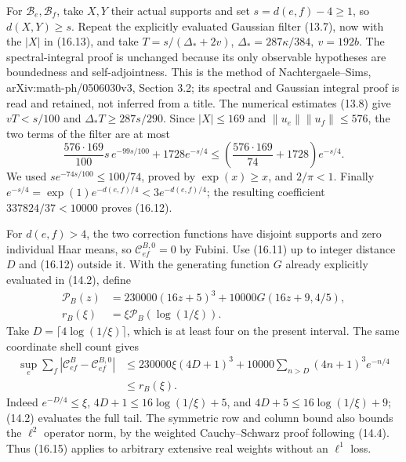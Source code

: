 \documentclass[
]{article}
\begin{document}
For \(\mathcal B_e,\mathcal B_f\), take \(X,Y\) their actual supports
and set \(s=d(e,f)-4\ge1\), so \(d(X,Y)\ge s\). Repeat the explicitly
evaluated Gaussian filter (13.7), now with the \(|X|\) in (16.13), and
take \(T=s/(\Delta_*+2v)\), \(\Delta_*=287\kappa/384,\ v=192b\). The
spectral-integral proof is unchanged because its only observable
hypotheses are boundedness and self-adjointness. This is the method of
Nachtergaele--Sims, arXiv:math-ph/0506030v3, Section 3.2; its spectral
and Gaussian integral proof is read and retained, not inferred from a
title. The numerical estimates (13.8) give \(vT<s/100\) and
\(\Delta_*T\ge287s/290\). Since \(|X|\le169\) and
\(\|u_e\|\|u_f\|\le576\), the two terms of the filter are at most \[
\frac{576\cdot169}{100}s\,e^{-99s/100}
       +1728e^{-s/4}
 \le\left(\frac{576\cdot169}{74}+1728\right)e^{-s/4}.
\] We used \(s e^{-74s/100}\le100/74\), proved by \(\exp(x)\ge x\), and
\(2/\pi<1\). Finally \(e^{-s/4}=\exp(1)e^{-d(e,f)/4}<3e^{-d(e,f)/4}\);
the resulting coefficient \(337824/37<10000\) proves (16.12).

For \(d(e,f)>4\), the two correction functions have disjoint supports
and zero individual Haar means, so \(\mathcal C^{B,0}_{ef}=0\) by
Fubini. Use (16.11) up to integer distance \(D\) and (16.12) outside it.
With the generating function \(G\) already explicitly evaluated in
(14.2), define \[
\begin{split}
\mathcal P_B(z)&=230000(16z+5)^3+10000G(16z+9,4/5),\\
r_B(\xi)&=\xi\mathcal P_B(\log(1/\xi)).
\end{split}                                                  \tag{16.14}
\] Take \(D=\lceil4\log(1/\xi)\rceil\), which is at least four on the
present interval. The same coordinate shell count gives \[
\begin{split}
\sup_e\sum_f|\mathcal C^B_{ef}-\mathcal C^{B,0}_{ef}|
&\le230000\xi(4D+1)^3
       +10000\sum_{n>D}(4n+1)^3e^{-n/4}\\
&\le r_B(\xi).
\end{split}                                                  \tag{16.15}
\] Indeed \(e^{-D/4}\le\xi\), \(4D+1\le16\log(1/\xi)+5\), and
\(4D+5\le16\log(1/\xi)+9\); (14.2) evaluates the full tail. The
symmetric row and column bound also bounds the \(\ell^2\) operator norm,
by the weighted Cauchy--Schwarz proof following (14.4). Thus (16.15)
applies to arbitrary extensive real weights without an \(\ell^1\) loss.
\end{document}

